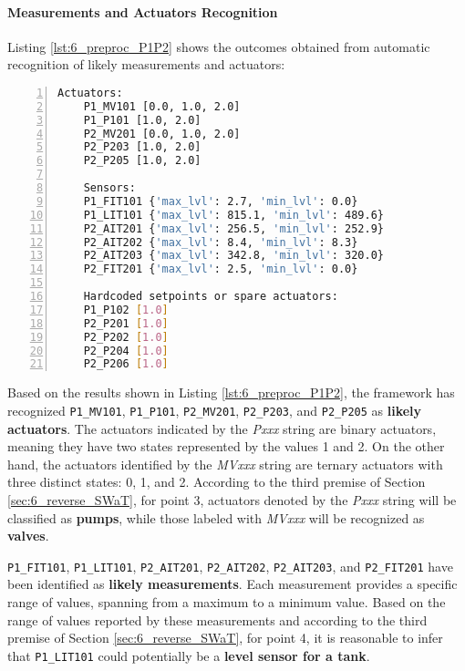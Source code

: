 \paragraph{Measurements and Actuators Recognition} 
\label{par:6_P1P2_measures_actuators_recognition}
Listing \ref{lst:6_preproc_P1P2} shows the outcomes obtained from automatic recognition of likely measurements and actuators:

\begin{lstlisting}[language=bash, numbers=left, caption=Preliminary analysis outcomes for sensors and actuators of \texttt{PLC1-2}, label=lst:6_preproc_P1P2]
	Actuators: 
	P1_MV101 [0.0, 1.0, 2.0]
	P1_P101 [1.0, 2.0]
	P2_MV201 [0.0, 1.0, 2.0]
	P2_P203 [1.0, 2.0]
	P2_P205 [1.0, 2.0]
	
	Sensors: 
	P1_FIT101 {'max_lvl': 2.7, 'min_lvl': 0.0}
	P1_LIT101 {'max_lvl': 815.1, 'min_lvl': 489.6}
	P2_AIT201 {'max_lvl': 256.5, 'min_lvl': 252.9}
	P2_AIT202 {'max_lvl': 8.4, 'min_lvl': 8.3}
	P2_AIT203 {'max_lvl': 342.8, 'min_lvl': 320.0}
	P2_FIT201 {'max_lvl': 2.5, 'min_lvl': 0.0}
	
	Hardcoded setpoints or spare actuators: 
	P1_P102 [1.0]
	P2_P201 [1.0]
	P2_P202 [1.0]
	P2_P204 [1.0]
	P2_P206 [1.0]
\end{lstlisting}

Based on the results shown in Listing \ref{lst:6_preproc_P1P2}, the framework has recognized \texttt{P1\_MV101}, \texttt{P1\_P101}, \texttt{P2\_MV201}, \texttt{P2\_P203}, and \texttt{P2\_P205} as \textbf{likely actuators}. The actuators indicated by the \textit{Pxxx} string are binary actuators, meaning they have two states represented by the values 1 and 2. On the other hand, the actuators identified by the \textit{MVxxx} string are ternary actuators with three distinct states: 0, 1, and 2. According to the third premise of Section \ref{sec:6_reverse_SWaT}, for point 3, actuators denoted by the \textit{Pxxx} string will be classified as \textbf{pumps}, while those labeled with \textit{MVxxx} will be recognized as \textbf{valves}.

\bigskip
\texttt{P1\_FIT101}, \texttt{P1\_LIT101}, \texttt{P2\_AIT201}, \texttt{P2\_AIT202}, \texttt{P2\_AIT203}, and \texttt{P2\_FIT201} have been identified as \textbf{likely measurements}. Each measurement provides a specific range of values, spanning from a maximum to a minimum value. Based on the range of values reported by these measurements and according to the third premise of Section \ref{sec:6_reverse_SWaT}, for point 4, it is reasonable to infer that \texttt{P1\_LIT101} could potentially be a \textbf{level sensor for a tank}.


